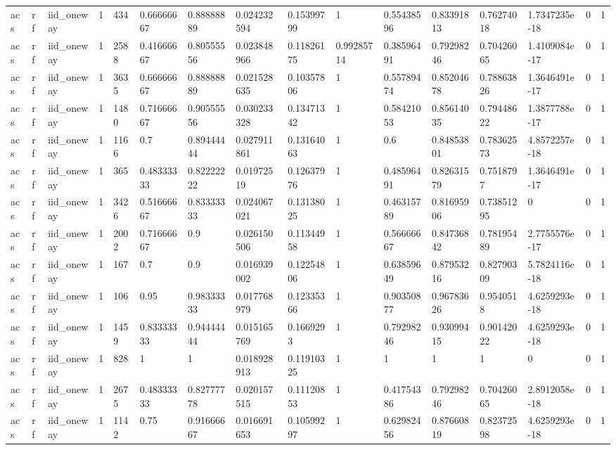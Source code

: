 \begin{tabular}{llllllllllllllll}
acs & rf & iid\_oneway & 1 & 434 & 0.66666667 & 0.88888889 & 0.024232594 & 0.15399799 & 1 & 0.55438596 & 0.83391813 & 0.76274018 & 1.7347235e-18 & 0 & 1 \\
acs & rf & iid\_oneway & 1 & 2588 & 0.41666667 & 0.80555556 & 0.023848966 & 0.11826175 & 0.99285714 & 0.38596491 & 0.79298246 & 0.70426065 & 1.4109084e-17 & 0 & 1 \\
acs & rf & iid\_oneway & 1 & 3635 & 0.66666667 & 0.88888889 & 0.021528635 & 0.10357806 & 1 & 0.55789474 & 0.85204678 & 0.78863826 & 1.3646491e-17 & 0 & 1 \\
acs & rf & iid\_oneway & 1 & 1480 & 0.71666667 & 0.90555556 & 0.030233328 & 0.13471342 & 1 & 0.58421053 & 0.85614035 & 0.79448622 & 1.3877788e-17 & 0 & 1 \\
acs & rf & iid\_oneway & 1 & 1166 & 0.7 & 0.89444444 & 0.027911861 & 0.13164063 & 1 & 0.6 & 0.84853801 & 0.78362573 & 4.8572257e-18 & 0 & 1 \\
acs & rf & iid\_oneway & 1 & 365 & 0.48333333 & 0.82222222 & 0.01972519 & 0.12637976 & 1 & 0.48596491 & 0.82631579 & 0.7518797 & 1.3646491e-17 & 0 & 1 \\
acs & rf & iid\_oneway & 1 & 3426 & 0.51666667 & 0.83333333 & 0.024067021 & 0.13138025 & 1 & 0.46315789 & 0.81695906 & 0.73851295 & 0 & 0 & 1 \\
acs & rf & iid\_oneway & 1 & 2002 & 0.71666667 & 0.9 & 0.026150506 & 0.11344958 & 1 & 0.56666667 & 0.84736842 & 0.78195489 & 2.7755576e-17 & 0 & 1 \\
acs & rf & iid\_oneway & 1 & 167 & 0.7 & 0.9 & 0.016939002 & 0.12254806 & 1 & 0.63859649 & 0.87953216 & 0.82790309 & 5.7824116e-18 & 0 & 1 \\
acs & rf & iid\_oneway & 1 & 106 & 0.95 & 0.98333333 & 0.017768979 & 0.12335366 & 1 & 0.90350877 & 0.96783626 & 0.9540518 & 4.6259293e-18 & 0 & 1 \\
acs & rf & iid\_oneway & 1 & 1459 & 0.83333333 & 0.94444444 & 0.015165769 & 0.1669293 & 1 & 0.79298246 & 0.93099415 & 0.90142022 & 4.6259293e-18 & 0 & 1 \\
acs & rf & iid\_oneway & 1 & 828 & 1 & 1 & 0.018928913 & 0.11910325 & 1 & 1 & 1 & 1 & 0 & 0 & 1 \\
acs & rf & iid\_oneway & 1 & 2675 & 0.48333333 & 0.82777778 & 0.020157515 & 0.11120853 & 1 & 0.41754386 & 0.79298246 & 0.70426065 & 2.8912058e-18 & 0 & 1 \\
acs & rf & iid\_oneway & 1 & 1142 & 0.75 & 0.91666667 & 0.016691653 & 0.10599297 & 1 & 0.62982456 & 0.87660819 & 0.82372598 & 4.6259293e-18 & 0 & 1 \\

\end{tabular}
